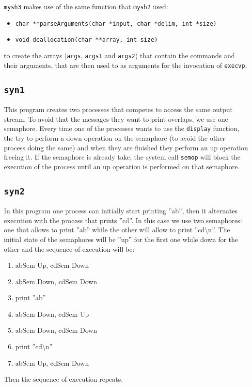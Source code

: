 \texttt{mysh3} makes use of the same function that \texttt{mysh2} used:
\begin{itemize}
\item{\texttt{char **parseArguments(char *input, char *delim, int *size)}}
\item{\texttt{void deallocation(char **array, int size)}}
\end{itemize}
to create the arrays (\texttt{args}, \texttt{args1} and \texttt{args2}) that contain the commands and their arguments, that are then used to as arguments for the invocation of \texttt{execvp}.



\subsection{\texttt{syn1}}
This program creates two processes that competes to access the same output stream. To avoid that the messages they want to print overlaps, we use one semaphore. Every time one of the processes wants to use the \texttt{display} function, the try to perform a down operation on the semaphore (to avoid the other process doing the same) and when they are finished they perform an up operation freeing it. If the semaphore is already take, the system call \texttt{semop} will block the execution of the process until an up operation is performed on that semaphore.
\subsection{\texttt{syn2}}
In this program one process can initially start printing ''ab'', then it alternates execution with the process that prints ''cd''. In this case we use two semaphores: one that allows to print ''ab'' while the other will allow to print ''cd\textbackslash{}n''. The initial state of the semaphores will be ''up'' for the first one while down for the other and the sequence of execution will be:
\begin{enumerate}
\item abSem Up, cdSem Down
\item abSem Down, cdSem Down
\item print ''ab''
\item abSem Down, cdSem Up
\item abSem Down, cdSem Down
\item print ''cd\textbackslash{}n''
\item abSem Up, cdSem Down
\end{enumerate}
Then the sequence of execution repeats.
